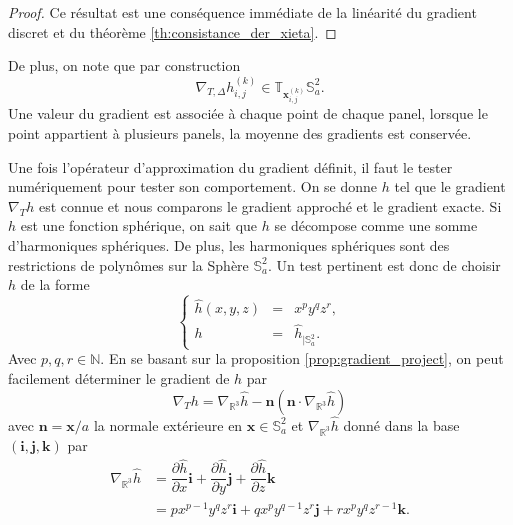 \begin{proof}
Ce résultat est une conséquence immédiate de la linéarité du gradient discret et du théorème \ref{th:consistance_der_xieta}.
\end{proof}
De plus, on note que par construction
\begin{equation}
\nabla_{T,\Delta} h_{i,j}^{(k)} \in \mathbb{T}_{\mathbf{x}_{i,j}^{(k)}} \mathbb{S}_a^2.
\end{equation}
Une valeur du gradient est associée à chaque point de chaque panel, lorsque le point appartient à plusieurs panels, la moyenne des gradients est conservée.




Une fois l'opérateur d'approximation du gradient définit, il faut le tester numériquement pour tester son comportement. On se donne $h$ tel que le gradient $\nabla_T h$ est connue et nous comparons le gradient approché et le gradient exacte.
Si $h$ est une fonction sphérique, on sait que $h$ se décompose comme une somme d'harmoniques sphériques. De plus, les harmoniques sphériques sont des restrictions de polynômes sur la Sphère $\mathbb{S}_a^2$. Un test pertinent est donc de choisir $h$ de la forme
\begin{equation}
\left\lbrace
\begin{array}{rcl}
\hat{h}(x,y,z) & = & x^p y^q z^r, \\
h & = & \hat{h}_{| \mathbb{S}_a^2}.
\end{array}
\right.
\label{eq:grad_test}
\end{equation}
Avec $p, q, r \in \mathbb{N}$.
En se basant sur la proposition \ref{prop:gradient_project}, on peut facilement déterminer le gradient de $h$ par
\begin{equation}
\nabla_T h = \nabla_{\mathbb{R}^3} \hat{h} - \mathbf{n} \left( \mathbf{n} \cdot \nabla_{\mathbb{R}^3} \hat{h} \right)
\end{equation}
avec $\mathbf{n} = \mathbf{x}/a$ la normale extérieure en $\mathbf{x} \in \mathbb{S}_a^2$ et $\nabla_{\mathbb{R}^3} \hat{h}$ donné dans la base $(\mathbf{i}, \mathbf{j}, \mathbf{k})$ par 
\begin{align*}
\nabla_{\mathbb{R}^3} \hat{h} & = \dfrac{\partial \hat{h}}{\partial x} \mathbf{i} + \dfrac{\partial \hat{h}}{\partial y} \mathbf{j} + \dfrac{\partial \hat{h}}{\partial z} \mathbf{k}\\
                              & = p x^{p-1} y^q z^r \mathbf{i} + q x^p y^{q-1} z^r \mathbf{j} + r x^p y^q z^{r-1} \mathbf{k}.
\end{align*}
